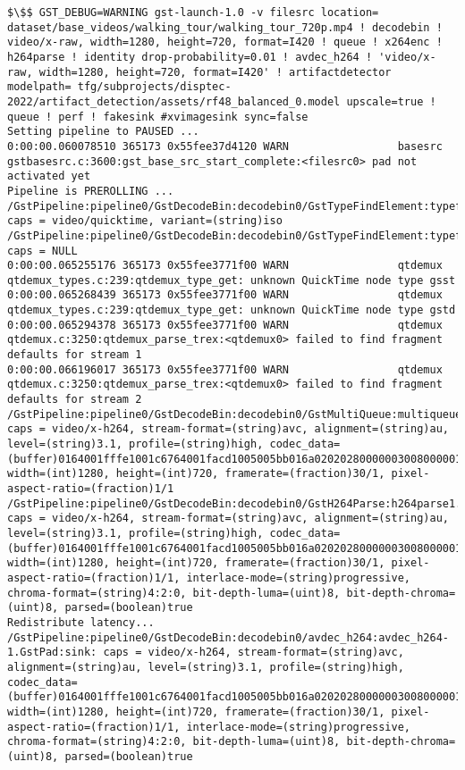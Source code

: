 \documentclass[12pt,oneside]{book}
\begin{document}
\begin{lstlisting}
$\$$ GST_DEBUG=WARNING gst-launch-1.0 -v filesrc location= dataset/base_videos/walking_tour/walking_tour_720p.mp4 ! decodebin ! video/x-raw, width=1280, height=720, format=I420 ! queue ! x264enc ! h264parse ! identity drop-probability=0.01 ! avdec_h264 ! 'video/x-raw, width=1280, height=720, format=I420' ! artifactdetector modelpath= tfg/subprojects/disptec-2022/artifact_detection/assets/rf48_balanced_0.model upscale=true ! queue ! perf ! fakesink #xvimagesink sync=false
Setting pipeline to PAUSED ...
0:00:00.060078510 365173 0x55fee37d4120 WARN                 basesrc gstbasesrc.c:3600:gst_base_src_start_complete:<filesrc0> pad not activated yet
Pipeline is PREROLLING ...
/GstPipeline:pipeline0/GstDecodeBin:decodebin0/GstTypeFindElement:typefind.GstPad:src: caps = video/quicktime, variant=(string)iso
/GstPipeline:pipeline0/GstDecodeBin:decodebin0/GstTypeFindElement:typefind.GstPad:src: caps = NULL
0:00:00.065255176 365173 0x55fee3771f00 WARN                 qtdemux qtdemux_types.c:239:qtdemux_type_get: unknown QuickTime node type gsst
0:00:00.065268439 365173 0x55fee3771f00 WARN                 qtdemux qtdemux_types.c:239:qtdemux_type_get: unknown QuickTime node type gstd
0:00:00.065294378 365173 0x55fee3771f00 WARN                 qtdemux qtdemux.c:3250:qtdemux_parse_trex:<qtdemux0> failed to find fragment defaults for stream 1
0:00:00.066196017 365173 0x55fee3771f00 WARN                 qtdemux qtdemux.c:3250:qtdemux_parse_trex:<qtdemux0> failed to find fragment defaults for stream 2
/GstPipeline:pipeline0/GstDecodeBin:decodebin0/GstMultiQueue:multiqueue0.GstPad:src_0: caps = video/x-h264, stream-format=(string)avc, alignment=(string)au, level=(string)3.1, profile=(string)high, codec_data=(buffer)0164001fffe1001c6764001facd1005005bb016a02020280000003008000001e078c188901000468eb8f2c, width=(int)1280, height=(int)720, framerate=(fraction)30/1, pixel-aspect-ratio=(fraction)1/1
/GstPipeline:pipeline0/GstDecodeBin:decodebin0/GstH264Parse:h264parse1.GstPad:src: caps = video/x-h264, stream-format=(string)avc, alignment=(string)au, level=(string)3.1, profile=(string)high, codec_data=(buffer)0164001fffe1001c6764001facd1005005bb016a02020280000003008000001e078c188901000468eb8f2c, width=(int)1280, height=(int)720, framerate=(fraction)30/1, pixel-aspect-ratio=(fraction)1/1, interlace-mode=(string)progressive, chroma-format=(string)4:2:0, bit-depth-luma=(uint)8, bit-depth-chroma=(uint)8, parsed=(boolean)true
Redistribute latency...
/GstPipeline:pipeline0/GstDecodeBin:decodebin0/avdec_h264:avdec_h264-1.GstPad:sink: caps = video/x-h264, stream-format=(string)avc, alignment=(string)au, level=(string)3.1, profile=(string)high, codec_data=(buffer)0164001fffe1001c6764001facd1005005bb016a02020280000003008000001e078c188901000468eb8f2c, width=(int)1280, height=(int)720, framerate=(fraction)30/1, pixel-aspect-ratio=(fraction)1/1, interlace-mode=(string)progressive, chroma-format=(string)4:2:0, bit-depth-luma=(uint)8, bit-depth-chroma=(uint)8, parsed=(boolean)true

\end{lstlisting}
\end{document}
